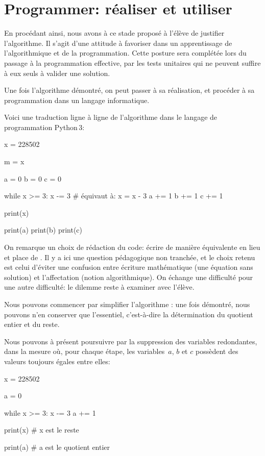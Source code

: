 


\section{Programmer: réaliser et utiliser}


En procédant ainsi, nous avons à ce stade proposé à l'élève de justifier l'algorithme. Il s'agit d'une attitude à favoriser dans un apprentissage de l'algorithmique et de la programmation. Cette posture sera complétée lors du passage à la programmation effective, par les tests unitaires qui ne peuvent suffire à eux seuls à valider une solution.

Une fois l'algorithme démontré, on peut passer à sa réalisation, et procéder à sa programmation dans un langage informatique.

Voici une traduction ligne à ligne de l'algorithme dans le langage de programmation \mbox{Python\,3}:

\begin{python}[distribution.py]
x = 228502

m = x

a = 0
b = 0
c = 0

while x >= 3:
	x -= 3 # équivaut à: x = x - 3
	a += 1
	b += 1
	c += 1

print(x)

print(a)
print(b)
print(c)
\end{python}

On remarque un choix de rédaction du code: écrire de manière équivalente \mbox{} en lieu et place de \mbox{}. Il y a ici une question pédagogique non tranchée, et le choix retenu est celui d'éviter une confusion entre écriture mathématique (une équation sans solution) et l'affectation (notion algorithmique). On échange une difficulté pour une autre difficulté: le dilemme reste à examiner avec l'élève.

Nous pouvons commencer par simplifier l'algorithme : une fois démontré, nous pouvons n'en conserver que l'essentiel, c'est-à-dire la détermination du quotient entier et du reste.

Nous pouvons à présent poursuivre par la suppression des variables redondantes, dans la mesure où, pour chaque étape, les variables~$a$, $b$ et $c$ possèdent des valeurs toujours égales entre elles:

\begin{python}[distribution2.py]
x = 228502

a = 0

while x >= 3:
	x -= 3
	a += 1

print(x) # x est le reste

print(a) # a est le quotient entier
\end{python}



